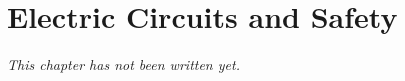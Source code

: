 \chapter{Electric Circuits and Safety}\label{ch:g6:circuits-and-safety}


\emph{This chapter has not been written yet.}
